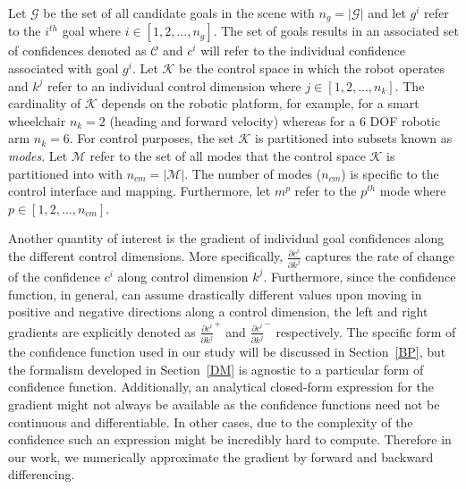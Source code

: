 \documentclass[conference]{IEEEtran}
\begin{document}
Let $\mathcal{G}$ be the set of all candidate goals in the scene with $n_g = \vert\mathcal{G}\vert$ and let $g^{i}$ refer to the $i^{th}$ goal where $i \in [1,2,\dots,n_g]$. The set of goals results in an associated set of confidences denoted as $\mathcal{C}$ and $c^{i}$ will refer to the individual confidence associated with goal $g^{i}$. Let $\mathcal{K}$ be the control space in which the robot operates and $k^{j}$ refer to an individual control dimension where $j \in [1,2,\dots,n_k]$.  The cardinality of $\mathcal{K}$ depends on the robotic platform, for example, for a smart wheelchair $n_k = 2$ (heading and forward velocity) whereas for a 6 DOF robotic arm $n_k = 6$.
For control purposes, the set $\mathcal{K}$ is partitioned into subsets known as \textit{modes}. Let $\mathcal{M}$ refer to the set of all modes that the control space $\mathcal{K}$ is partitioned into with $n_{cm} = \vert\mathcal{M}\vert$. The number of modes ($n_{cm}$) is specific to the control interface and mapping. Furthermore, let $m^{p}$ refer to the $p^{th}$ mode where $p \in [1,2,\dots,n_{cm}]$.

Another quantity of interest is the gradient of individual goal confidences along the different control dimensions. More specifically, $\frac{\partial c^i}{\partial k^j}$ captures the rate of change of the confidence $c^{i}$ along control dimension $k^{j}$. Furthermore, since the confidence function, in general, can assume drastically different values upon moving in positive and negative directions along a control dimension, the left and right gradients are explicitly denoted as $\frac{\partial c^i}{\partial k^j}^{+}$ and $\frac{\partial c^i}{\partial k^j}^{-}$ respectively. The specific form of the confidence function used in our study will be discussed in Section~\ref{BP}, but the formalism developed in Section~\ref{DM} is agnostic to a particular form of confidence function. Additionally, an analytical closed-form expression for the gradient might not always be available as the confidence functions need not be continuous and differentiable. In other cases, due to the complexity of the confidence such an expression might be incredibly hard to compute. Therefore in our work, we numerically approximate the gradient by forward and backward differencing. 
\end{document}
